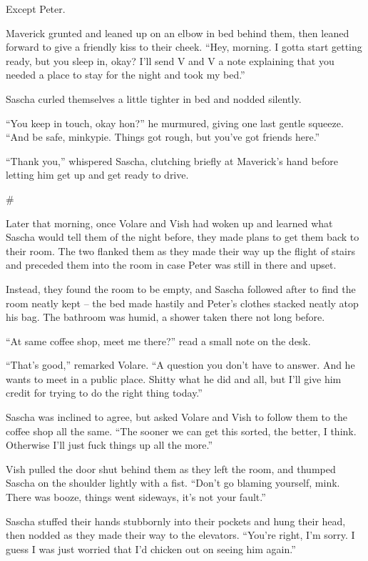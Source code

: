 \documentclass[12pt,letterpaper,oneside]{memoir}
\newcommand\secdiv{
  \begin{center}
    \#
  \end{center}
}
\begin{document}
  Except Peter.

  Maverick grunted and leaned up on an elbow in bed behind them, then leaned forward to give a friendly kiss to their cheek. ``Hey, morning. I gotta start getting ready, but you sleep in, okay? I'll send V and V a note explaining that you needed a place to stay for the night and took my bed.''

  Sascha curled themselves a little tighter in bed and nodded silently.

  ``You keep in touch, okay hon?'' he murmured, giving one last gentle squeeze. ``And be safe, minkypie. Things got rough, but you've got friends here.''

  ``Thank you,'' whispered Sascha, clutching briefly at Maverick's hand before letting him get up and get ready to drive.

  \secdiv

  Later that morning, once Volare and Vish had woken up and learned what Sascha would tell them of the night before, they made plans to get them back to their room. The two flanked them as they made their way up the flight of stairs and preceded them into the room in case Peter was still in there and upset.

  Instead, they found the room to be empty, and Sascha followed after to find the room neatly kept -- the bed made hastily and Peter's clothes stacked neatly atop his bag. The bathroom was humid, a shower taken there not long before.

  ``At same coffee shop, meet me there?'' read a small note on the desk.

  ``That's good,'' remarked Volare. ``A question you don't have to answer. And he wants to meet in a public place. Shitty what he did and all, but I'll give him credit for trying to do the right thing today.''

  Sascha was inclined to agree, but asked Volare and Vish to follow them to the coffee shop all the same. ``The sooner we can get this sorted, the better, I think. Otherwise I'll just fuck things up all the more.''

  Vish pulled the door shut behind them as they left the room, and thumped Sascha on the shoulder lightly with a fist. ``Don't go blaming yourself, mink. There was booze, things went sideways, it's not your fault.''

  Sascha stuffed their hands stubbornly into their pockets and hung their head, then nodded as they made their way to the elevators. ``You're right, I'm sorry. I guess I was just worried that I'd chicken out on seeing him again.''
\end{document}
